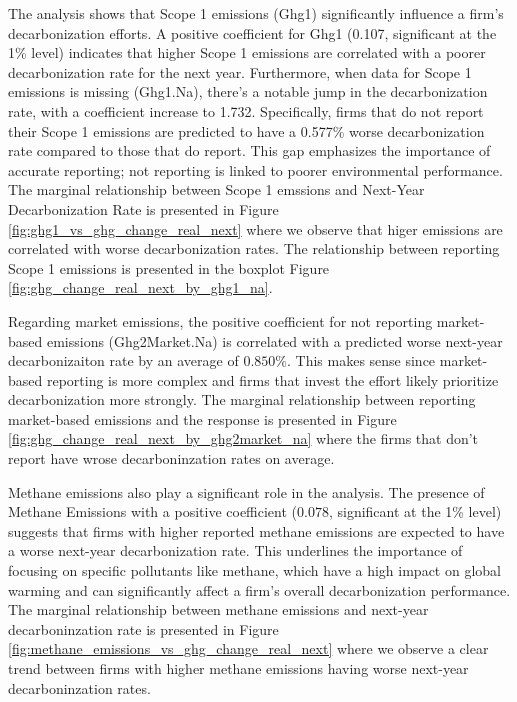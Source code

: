 The analysis shows that Scope 1 emissions (Ghg1) significantly influence a firm's decarbonization efforts. A positive coefficient for Ghg1 (0.107, significant at the 1\% level) indicates that higher Scope 1 emissions are correlated with a poorer decarbonization rate for the next year. Furthermore, when data for Scope 1 emissions is missing (Ghg1.Na), there's a notable jump in the decarbonization rate, with a coefficient increase to 1.732. Specifically, firms that do not report their Scope 1 emissions are predicted to have a 0.577\% worse decarbonization rate compared to those that do report. This gap emphasizes the importance of accurate reporting; not reporting is linked to poorer environmental performance. The marginal relationship between Scope 1 emssions and Next-Year Decarbonization Rate is presented in Figure \ref{fig:ghg1_vs_ghg_change_real_next} where we observe that higer emissions are correlated with worse decarbonization rates. The relationship between reporting Scope 1 emissions is presented in the boxplot Figure \ref{fig:ghg_change_real_next_by_ghg1_na}.


Regarding market emissions, the positive coefficient for not reporting market-based emissions (Ghg2Market.Na) is correlated with a predicted worse next-year decarbonizaiton rate by an average of $0.850 \%$. This makes sense since market-based reporting is more complex and firms that invest the effort likely prioritize decarbonization more strongly. The marginal relationship between reporting market-based emissions and the response is presented in Figure \ref{fig:ghg_change_real_next_by_ghg2market_na} where the firms that don't report have wrose decarboninzation rates on average.
    

Methane emissions also play a significant role in the analysis. The presence of Methane Emissions with a positive coefficient ($0.078$, significant at the 1\% level) suggests that firms with higher reported methane emissions are expected to have a worse next-year decarbonization rate. This underlines the importance of focusing on specific pollutants like methane, which have a high impact on global warming and can significantly affect a firm's overall decarbonization performance. The marginal relationship between methane emissions and next-year decarboninzation rate is presented in Figure \ref{fig:methane_emissions_vs_ghg_change_real_next} where we observe a clear trend between firms with higher methane emissions having worse next-year decarboninzation rates.
    


